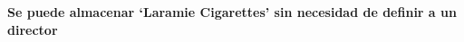 \textbf{Se puede almacenar ‘Laramie Cigarettes’ sin necesidad de definir a un director}\vspace{.3cm}
